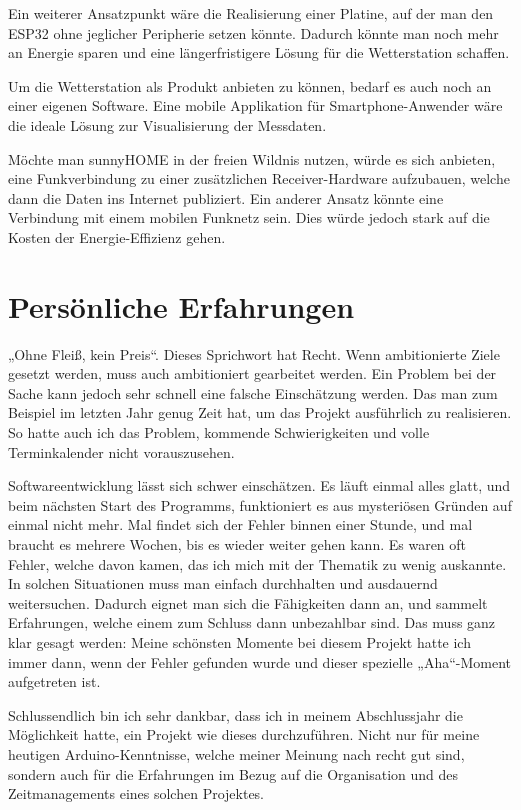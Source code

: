     Ein weiterer Ansatzpunkt wäre die Realisierung einer Platine, auf der man den ESP32 ohne jeglicher Peripherie setzen könnte. Dadurch könnte man noch mehr an Energie sparen und eine längerfristigere Lösung für die Wetterstation schaffen. 
    
    Um die Wetterstation als Produkt anbieten zu können, bedarf es auch noch an einer eigenen Software. Eine mobile Applikation für Smartphone-Anwender wäre die ideale Lösung zur Visualisierung der Messdaten.
    
    Möchte man sunnyHOME in der freien Wildnis nutzen, würde es sich anbieten, eine Funkverbindung zu einer zusätzlichen Receiver-Hardware aufzubauen, welche dann die Daten ins Internet publiziert. Ein anderer Ansatz könnte eine Verbindung mit einem mobilen Funknetz sein. Dies würde jedoch stark auf die Kosten der Energie-Effizienz gehen. 

\pagebreak

\section{Persönliche Erfahrungen}

„Ohne Fleiß, kein Preis“. Dieses Sprichwort hat Recht. Wenn ambitionierte Ziele gesetzt werden, muss auch ambitioniert gearbeitet werden. Ein Problem bei der Sache kann jedoch sehr schnell eine falsche Einschätzung werden. Das man zum Beispiel im letzten Jahr genug Zeit hat, um das Projekt ausführlich zu realisieren. So hatte auch ich das Problem, kommende Schwierigkeiten und volle Terminkalender nicht vorauszusehen. 

Softwareentwicklung lässt sich schwer einschätzen. Es läuft einmal alles glatt, und beim nächsten Start des Programms, funktioniert es aus mysteriösen Gründen auf einmal nicht mehr. Mal findet sich der Fehler binnen einer Stunde, und mal braucht es mehrere Wochen, bis es wieder weiter gehen kann. Es waren oft Fehler, welche davon kamen, das ich mich mit der Thematik zu wenig auskannte. In solchen Situationen muss man einfach durchhalten und ausdauernd weitersuchen. Dadurch eignet man sich die Fähigkeiten dann an, und sammelt Erfahrungen, welche einem zum Schluss dann unbezahlbar sind. Das muss ganz klar gesagt werden: Meine schönsten Momente bei diesem Projekt hatte ich immer dann, wenn der Fehler gefunden wurde und dieser spezielle „Aha“-Moment aufgetreten ist. 

Schlussendlich bin ich sehr dankbar, dass ich in meinem Abschlussjahr die Möglichkeit hatte, ein Projekt wie dieses durchzuführen. Nicht nur für meine heutigen Arduino-Kenntnisse, welche meiner Meinung nach recht gut sind, sondern auch für die Erfahrungen im Bezug auf die Organisation und des Zeitmanagements eines solchen Projektes. 